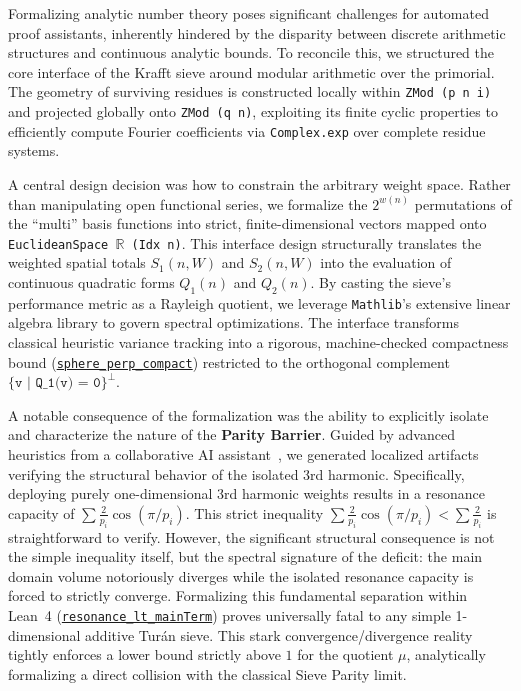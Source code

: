\documentclass[lean]{AFM}
\renewcommand{\.}{\hskip .75pt}
\def\urlpfx{https://github.com/ElNando888/KrafftSieve/blob/v1.0}
\begin{document}
Formalizing analytic number theory poses significant challenges for automated proof assistants,
inherently hindered by the disparity between discrete arithmetic structures and continuous analytic
bounds. To reconcile this, we structured the core interface of the Krafft sieve around modular
arithmetic over the primorial. The geometry of surviving residues is constructed locally within
\texttt{ZMod (p n i)} and projected globally onto \texttt{ZMod (q n)}, exploiting its finite cyclic
properties to efficiently compute Fourier coefficients via \texttt{Complex.exp} over complete
residue systems. 

A central design decision was how to constrain the arbitrary weight space. Rather than manipulating
open functional series, we formalize the $2^{w(n)}$ permutations of the ``multi'' basis functions
into strict, finite-dimensional vectors mapped onto \texttt{EuclideanSpace $\mathbb{R}$ (Idx n)}.
This interface design structurally translates the weighted spatial totals $S_1(n, W)$ and $S_2(n, W)$
into the evaluation of continuous quadratic forms $Q_1(n)$ and $Q_2(n)$. By casting the sieve's
performance metric as a Rayleigh quotient, we leverage \texttt{Mathlib}'s extensive linear algebra
library to govern spectral optimizations. The interface transforms classical heuristic variance
tracking into a rigorous, machine-checked compactness bound
(\href{\urlpfx/KrafftSieve/OptimalWeights.lean#L459}{\texttt{sphere\_perp\_compact}})
restricted to the orthogonal complement $\texttt{\{v | Q\_1(v) = 0\}}^{\perp}$.

A notable consequence of the formalization was the ability to explicitly isolate and characterize
the nature of the \textbf{Parity Barrier}. Guided by advanced heuristics from a collaborative AI
assistant~\cite{Achim2025}, we generated localized artifacts verifying the structural behavior
of the isolated 3rd harmonic. Specifically, deploying purely one-dimensional 3rd harmonic weights
results in a resonance capacity of $\sum \frac{2}{p_i} \cos(\pi/p_i)$. This strict inequality
$\sum \frac{2}{p_i}\cos(\pi/p_i) < \sum \frac{2}{p_i}$ is straightforward to verify. However,
the significant structural consequence is not the simple inequality itself, but the spectral
signature of the deficit: the main domain volume notoriously diverges while the isolated resonance
capacity is forced to strictly converge. Formalizing this fundamental separation within Lean~4
(\href{\urlpfx/KrafftSieve/ThirdHarmonic.lean#L823}{\texttt{resonance\_lt\_mainTerm}}) proves
universally fatal to any simple 1-dimensional additive Turán sieve. This stark
convergence/divergence reality tightly enforces a lower bound strictly above $1$ for the quotient
$\mu$, analytically formalizing a direct collision with the classical Sieve Parity limit.
\end{document}
